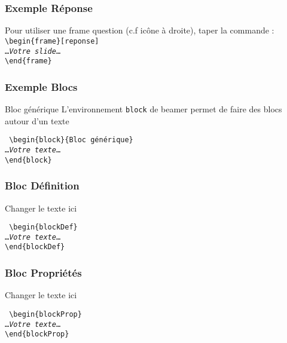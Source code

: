 \documentclass[aspectratio=169]{beamer}
\begin{document}
\begin{frame}[reponse]
    \frametitle{Exemple \og Réponse\fg}

Pour utiliser une frame question (c.f icône à droite), taper la commande :
\noindent\texttt{%
\textbackslash begin\{frame\}[reponse]\\
\ldots\emph{Votre slide}\ldots\\
\textbackslash end\{frame\}
}
\end{frame}
\begin{frame}
    \frametitle{Exemple \og Blocs\fg}
    \begin{block}{Bloc générique}
        L'environnement \texttt{block} de beamer permet de faire des blocs
        autour d'un texte
    \end{block}
\noindent\texttt{%
\textbackslash begin\{block\}\{Bloc générique\}\\
\ldots\emph{Votre texte}\ldots\\
\textbackslash end\{block\}
}
\end{frame}
\begin{frame}
    \frametitle{Bloc \og Définition\fg}
    \begin{blockDef}
        Changer le texte ici
    \end{blockDef}
\noindent\texttt{%
\textbackslash begin\{blockDef\}\\
\ldots\emph{Votre texte}\ldots\\
\textbackslash end\{blockDef\}
}
\end{frame}
\begin{frame}
    \frametitle{Bloc \og Propriétés\fg}
    \begin{blockProp}
        Changer le texte ici
    \end{blockProp}
\noindent\texttt{%
\textbackslash begin\{blockProp\}\\
\ldots\emph{Votre texte}\ldots\\
\textbackslash end\{blockProp\}
}
\end{frame}
\end{document}
